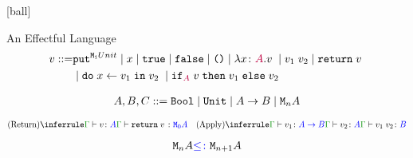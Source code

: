 


[ball]














\begin{frame}{An Effectful Language}
    \begin{align*}
        v ::= & \texttt{put}^{\texttt{M}_{\texttt{1}}{Unit}} \mid x\mid \texttt{true} \mid\texttt{false} \mid\texttt{()}\mid\lambda x \colon {\color{purple}A}. v\;\mid v_1\; v_2\mid\texttt{return} \; v\;\\
        & \mid\texttt{do}\; x \leftarrow v_1 \;\texttt{in}\; v_2\;\mid\texttt{if}_{\textcolor{purple}{A}}\; v\; \texttt{then}\; v_1 \;\texttt{else} \; v_2\; 
    \end{align*}
    
    \begin{align*}
        A, B, C ::= \texttt{Bool} \mid \texttt{Unit} \mid A\rightarrow B \mid\texttt{M}_{n}{A}
    \end{align*}

    \[
        \ntreeruleI{Return}{\gtyperelation{v}{A}}{\gtyperelation{\return{v}}{\M{0}{A}}}
    \quad
    \ntreeruleII{Apply}{\gtyperelation{v_1}{\ab}}{\gtyperelation{v_2}{A}}{\gtyperelation{\apply{v_1}{v_2}}{B}}
    \]

    \[
    \texttt{M}_{n}{A} {\color{blue} \leq\colon} \texttt{M}_{n+1}{A}    
    \]

\end{frame}





